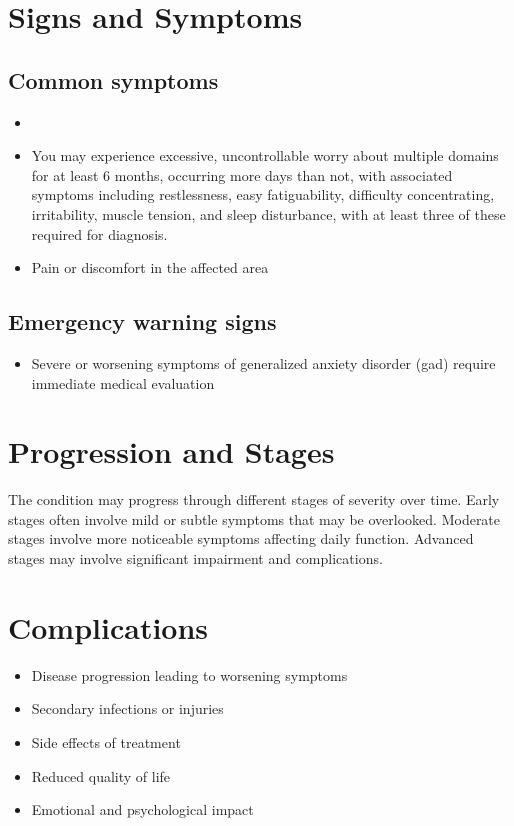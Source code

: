 \section{Signs and Symptoms}
\subsection{Common symptoms}
\begin{itemize}[noitemsep]
  \item \item You may experience excessive, uncontrollable worry about multiple domains for at least 6 months, occurring more days than not, with associated symptoms including restlessness, easy fatiguability, difficulty concentrating, irritability, muscle tension, and sleep disturbance, with at least three of these required for diagnosis.
  \item Pain or discomfort in the affected area
  \end{itemize}
\subsection{Emergency warning signs}
\begin{itemize}[noitemsep]
  \item Severe or worsening symptoms of generalized anxiety disorder (gad) require immediate medical evaluation
\end{itemize}
\section{Progression and Stages}
The condition may progress through different stages of severity over time. Early stages often involve mild or subtle symptoms that may be overlooked. Moderate stages involve more noticeable symptoms affecting daily function. Advanced stages may involve significant impairment and complications.
\section{Complications}
\begin{itemize}[noitemsep]
  \item Disease progression leading to worsening symptoms
  \item Secondary infections or injuries
  \item Side effects of treatment
  \item Reduced quality of life
  \item Emotional and psychological impact
\end{itemize}
